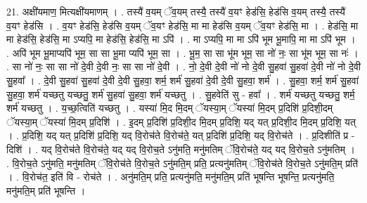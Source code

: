 \documentclass[17pt]{extarticle}
\begin{document}
21. अक्षी॑यमाण॒ मित्यक्षी॑यमाणम् । . तस्यै॑ व॒यम् ॅव॒यम् तस्यै॒ तस्यै॑ व॒यꣳ हेड॑सि॒ हेड॑सि व॒यम् तस्यै॒ तस्यै॑ व॒यꣳ हेड॑सि । . व॒यꣳ हेड॑सि॒ हेड॑सि व॒यम् ॅव॒यꣳ हेड॑सि॒ मा मा हेड॑सि व॒यम् ॅव॒यꣳ हेड॑सि॒ मा । . हेड॑सि॒ मा मा हेड॑सि॒ हेड॑सि॒ मा ऽप्यपि॒ मा हेड॑सि॒ हेड॑सि॒ मा ऽपि॑ । . मा ऽप्यपि॒ मा मा ऽपि॑ भूम भू॒मापि॒ मा मा ऽपि॑ भूम । . अपि॑ भूम भू॒माप्यपि॑ भूम॒ सा सा भू॒मा प्यपि॑ भूम॒ सा । . भू॒म॒ सा सा भू॑म भूम॒ सा नो॑ नः॒ सा भू॑म भूम॒ सा नः॑ । . सा नो॑ नः॒ सा सा नो॑ दे॒वी दे॒वी नः॒ सा सा नो॑ दे॒वी । . नो॒ दे॒वी दे॒वी नो॑ नो दे॒वी सु॒हवा॑ सु॒हवा॑ दे॒वी नो॑ नो दे॒वी सु॒हवा᳚ । . दे॒वी सु॒हवा॑ सु॒हवा॑ दे॒वी दे॒वी सु॒हवा॒ शर्म॒ शर्म॑ सु॒हवा॑ दे॒वी दे॒वी सु॒हवा॒ शर्म॑ । . सु॒हवा॒ शर्म॒ शर्म॑ सु॒हवा॑ सु॒हवा॒ शर्म॑ यच्छतु यच्छतु॒ शर्म॑ सु॒हवा॑ सु॒हवा॒ शर्म॑ यच्छतु । . सु॒हवेति॑ सु - हवा᳚ । . शर्म॑ यच्छतु यच्छतु॒ शर्म॒ शर्म॑ यच्छतु । . य॒च्छ॒त्विति॑ यच्छतु । . यस्या॑ मि॒द मि॒दम् ॅयस्या॒म् ॅयस्या॑ मि॒दम् प्र॒दिशि॑ प्र॒दिशी॒दम् ॅयस्या॒म् ॅयस्या॑ मि॒दम् प्र॒दिशि॑ । . इ॒दम् प्र॒दिशि॑ प्र॒दिशी॒द मि॒दम् प्र॒दिशि॒ यद् यत् प्र॒दिशी॒द मि॒दम् प्र॒दिशि॒ यत् । . प्र॒दिशि॒ यद् यत् प्र॒दिशि॑ प्र॒दिशि॒ यद् वि॒रोच॑ते वि॒रोच॑ते॒ यत् प्र॒दिशि॑ प्र॒दिशि॒ यद् वि॒रोच॑ते । . प्र॒दिशीति॑ प्र - दिशि॑ । . यद् वि॒रोच॑ते वि॒रोच॑ते॒ यद् यद् वि॒रोच॒ते ऽनु॑मति॒ मनु॑मतिम् ॅवि॒रोच॑ते॒ यद् यद् वि॒रोच॒ते ऽनु॑मतिम् । . वि॒रोच॒ते ऽनु॑मति॒ मनु॑मतिम् ॅवि॒रोच॑ते वि॒रोच॒ते ऽनु॑मति॒म् प्रति॒ प्रत्यनु॑मतिम् ॅवि॒रोच॑ते वि॒रोच॒ते ऽनु॑मति॒म् प्रति॑ । . वि॒रोच॑त॒ इति॑ वि - रोच॑ते । . अनु॑मति॒म् प्रति॒ प्रत्यनु॑मति॒ मनु॑मति॒म् प्रति॑ भूषन्ति भूषन्ति॒ प्रत्यनु॑मति॒ मनु॑मति॒म् प्रति॑ भूषन्ति । \newline
\end{document}
